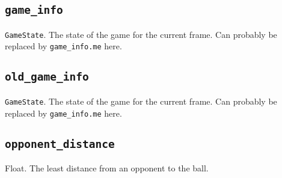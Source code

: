 \documentclass{article}
\newcommand{\argumenta}[1]{\subsection{\texttt{#1}}}
\begin{document}
\begin{flushleft}
{           \argumenta{game\_info}
                     {
                       \texttt{GameState}.  The state of the game for the current frame.  Can probably be replaced by \texttt{game\_info.me} here.
                     }
           \argumenta{old\_game\_info}
                     {
                       \texttt{GameState}.  The state of the game for the current frame.  Can probably be replaced by \texttt{game\_info.me} here.
                     }
           \argumenta{opponent\_distance}
                     {
                       Float.  The least distance from an opponent to the ball.
                     }
         }
































  
  





\end{flushleft}
\end{document}
